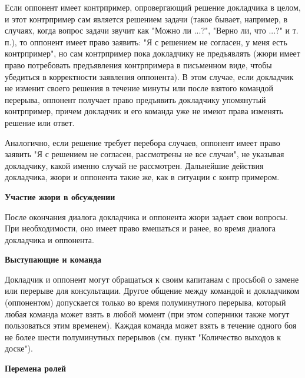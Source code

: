 \documentclass{article}
\begin{document}
Если оппонент имеет контрпример, опровергающий решение докладчика в целом, и этот контрпример сам является решением задачи (такое бывает, например, в случаях, когда вопрос задачи звучит как "Можно ли ...?", "Верно ли, что ...?" и т. п.), то оппонент имеет право заявить: "Я с решением не согласен, у меня есть контрпример", но сам контрпример пока докладчику не предъявлять (жюри имеет право потребовать предъявления контрпримера в письменном виде, чтобы убедиться в корректности заявления оппонента). В этом случае, если докладчик не изменит своего решения в течение минуты или после взятого командой перерыва, оппонент получает право предъявить докладчику упомянутый контрпример, причем докладчик и его команда уже не имеют права изменять решение или ответ.

Аналогично, если решение требует перебора случаев, оппонент имеет право заявить "Я с решением не согласен, рассмотрены не все случаи", не указывая докладчику, какой именно случай не рассмотрен. Дальнейшие действия докладчика, жюри и оппонента такие же, как в ситуации с контр примером.

\begin{center}
\textbf{Участие жюри в обсуждении}
\end{center}

После окончания диалога докладчика и оппонента жюри задает свои вопросы. При необходимости, оно имеет право вмешаться и ранее, во время диалога докладчика и оппонента.

\begin{center}
	\textbf{Выступающие и команда}
\end{center}

Докладчик и оппонент могут обращаться к своим капитанам с просьбой о замене или перерыве для консультации. Другое общение между командой и докладчиком (оппонентом) допускается только во время полуминутного перерыва, который любая команда может взять в любой момент (при этом соперники также могут пользоваться этим временем). Каждая команда может взять в течение одного боя не более шести полуминутных перерывов (см. пункт "Количество выходов к доске").

\begin{center}
	\textbf{Перемена ролей}
\end{center}
\end{document}
